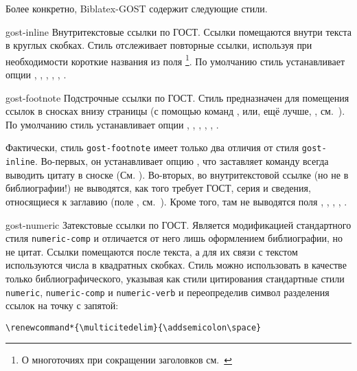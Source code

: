 \documentclass[11pt,a4paper,headings=small,numbers=enddot]{ltxdockit}[2011/03/25]
\newcommand*{\biblatexgost}{Biblatex-GOST\xspace}
\newcommand{\bibsty}{\texttt}
\renewcommand*{\tabref}{\refs{табл.}{табл.}}
\begin{document}
Более конкретно, \biblatexgost содержит следующие стили.

\begin{marglist}

\item[gost-inline]
Внутритекстовые ссылки по ГОСТ. Ссылки помещаются внутри текста в круглых скобках. 
Стиль отслеживает
повторные ссылки, используя при необходимости короткие названия из поля
\footnote{О многоточиях при сокращении заголовков 
см.~}.  
По умолчанию стиль устанавливает опции , , 
, , , 
.

\item[gost-footnote]
Подстрочные ссылки по ГОСТ.  
Стиль предназначен для помещения ссылок в сносках внизу страницы (с помощью 
команд ,  или, ещё лучше, , см.~). 
По умолчанию стиль устанавливает опции , ,
, , , 
.

Фактически, стиль \bibsty{gost-footnote} имеет только два отличия от стиля 
\bibsty{gost-inline}. 
Во-первых, он устанавливает опцию , что заставляет команду
 всегда выводить цитату в сноске 
(См. ). Во-вторых, во внутритекстовой ссылке (но не 
в библиографии!) не выводятся, как того требует ГОСТ, серия и сведения, относящиеся 
к заглавию (поле , см.~\tabref{tab:gost-biblatex}). Кроме того,
там не выводятся поля , 
, , , . 

\item[gost-numeric]
Затекстовые ссылки по ГОСТ. Является модификацией стандартного стиля \bibsty{numeric-comp} и отличается от него лишь оформлением библиографии, но не цитат. Ссылки помещаются после текста, а для их связи с текстом используются числа в квадратных скобках. Стиль можно использовать в качестве только 
библиографического, указывая как стили цитирования стандартные стили \bibsty{numeric}, 
\bibsty{numeric-comp} и \bibsty{numeric-verb} и переопределив символ разделения ссылок на
точку с запятой:

\begin{lstlisting}[style=latex]
\renewcommand*{\multicitedelim}{\addsemicolon\space}
\end{lstlisting}


\end{marglist}
\end{document}
